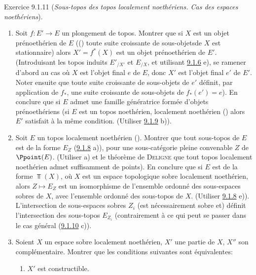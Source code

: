\documentclass[10pt]{../fichiers-configuration-latex/smfart}
\begin{document}
\begin{enonce*}[remark]{Exercice 9.1.11}
(\emph{Sous-topos des topos localement noethériens. Cas des espaces
noethériens}).
\begin{enumerate}
\renewcommand{\theenumi}{\alph{enumi}}
\renewcommand{\labelenumi}{\theenumi)}
\item Soit $f:E'\rightarrow E$ un plongement de topos. Montrer que si
$X$ est un objet prénoethérien de $E$ (\ie () toute suite
croissante de sous-objets\pageoriginale de $X$ est stationnaire)
alors $X'=f^{\ast}(X)$ est un objet prénoethérien de $E'$.
(Introduisant les topos induits ${E'}_{/X'}$ et $E_{/X}$, et
utilisant \hyperref[IV.exer9.1.6]{9.1.6} e), se ramener d'abord au cas où $X$
est l'objet final $e$ de $E$, donc $X'$ est l'objet final $e'$ de
$E'$. Noter ensuite que toute suite croissante de sous-objets de
$e'$ définit, par application de $f_{\ast}$, une suite croissante de
sous-objets de $f_{\ast}(e')=e$). En conclure que si $E$ admet une
famille génératrice formée d'objets prénoethériens (\resp si $E$ est
un topos noethérien, \resp localement noethérien () alors $E'$
satisfait à la même condition. (Utiliser \hyperref[IV.exer9.1.9]{9.1.9} b)).

\item Soit $E$ un topos localement noethérien (). Montrer que
tout sous-topos de $E$ est de la forme $E_Z$ (\hyperref[IV.exer9.1.8]{9.1.8}
a)), pour une sous-catégorie pleine convenable $Z$ de $\Ppoint(E)$.
(Utiliser a) et le théorème de \textsc{Deligne} que tout topos
localement noethérien admet suffisamment de points). En conclure que
si $E$ est de la forme $\Top(X)$, où $X$ est un espace topologique
sobre localement noethérien, alors $Z\mapsto E_Z$ est un
isomorphisme de l'ensemble ordonné des sous-espaces sobres de $X$,
avec l'ensemble ordonné des sous-topos de $X$. (Utiliser
\hyperref[IV.exer9.1.8]{9.1.8} e)). L'intersection de sous-espaces sobres $Z_i$
(est nécessairement sobre et) définit l'intersection des sous-topos
$E_{Z_i}$ (contrairement à ce qui peut se passer dans le cas général
(\hyperref[IV.exer9.1.10]{9.1.10} c)).

\item Soient $X$ un espace sobre localement noethérien, $X'$ une
partie de $X$, $X''$ son complémentaire. Montrer que les conditions
suivantes sont équivalentes:
\begin{enumerate}
\renewcommand{\theenumii}{\roman{enumii}}
\renewcommand{\labelenumii}{(\theenumii)}
\item $X'$ est constructible.


\end{enumerate}
\end{enumerate}
\end{enonce*}
\end{document}
